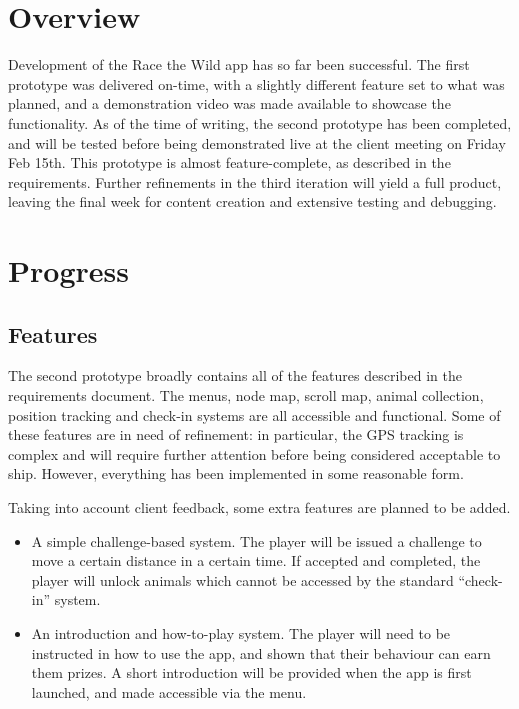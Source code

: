 \documentclass[12pt,a4paper,twoside]{article}
\begin{document}

\newpage
\pagestyle{empty}
\cleardoublepage                             %
\newpage

\section{Overview}

Development of the Race the Wild app has so far been successful. The first prototype was delivered on-time, with a slightly different feature set to what was planned, and a demonstration video was made available to showcase the functionality. As of the time of writing, the second prototype has been completed, and will be tested before being demonstrated live at the client meeting on Friday Feb 15th. This prototype is almost feature-complete, as described in the requirements. Further refinements in the third iteration will yield a full product, leaving the final week for content creation and extensive testing and debugging.

\section{Progress}

\subsection{Features}

The second prototype broadly contains all of the features described in the requirements document. The menus, node map, scroll map, animal collection, position tracking and check-in systems are all accessible and functional. Some of these features are in need of refinement: in particular, the GPS tracking is complex and will require further attention before being considered acceptable to ship. However, everything has been implemented in some reasonable form.

Taking into account client feedback, some extra features are planned to be added.
\begin{itemize}
\item A simple challenge-based system. The player will be issued a challenge to move a certain distance in a certain time. If accepted and completed, the player will unlock animals which cannot be accessed by the standard ``check-in'' system.
\item An introduction and how-to-play system. The player will need to be instructed in how to use the app, and shown that their behaviour can earn them prizes. A short introduction will be provided when the app is first launched, and made accessible via the menu.
\end{itemize}
\end{document}
